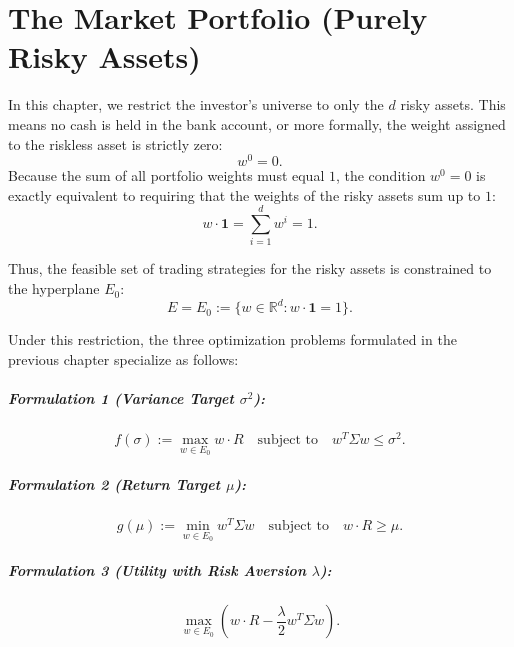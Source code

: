 \chapter{The Market Portfolio (Purely Risky Assets)}

In this chapter, we restrict the investor's universe to only the $d$ risky assets. This means no cash is held in the bank account, or more formally, the weight assigned to the riskless asset is strictly zero:
\begin{equation}
    w^0 = 0.
\end{equation}
Because the sum of all portfolio weights must equal $1$, the condition $w^0 = 0$ is exactly equivalent to requiring that the weights of the risky assets sum up to $1$:
\begin{equation}
    w \cdot \mathbf{1} = \sum_{i=1}^d w^i = 1.
\end{equation}

Thus, the feasible set of trading strategies for the risky assets is constrained to the hyperplane $E_0$:
\begin{equation}
    E = E_0 := \{ w \in \mathbb{R}^d : w \cdot \mathbf{1} = 1 \}.
\end{equation}

Under this restriction, the three optimization problems formulated in the previous chapter specialize as follows:

\paragraph{Formulation 1 (Variance Target $\sigma^2$):}
\begin{equation}
    f(\sigma) := \max_{w \in E_0} w \cdot R \quad \text{subject to} \quad w^T \Sigma w \leq \sigma^2. \label{eq:p1_market}
\end{equation}

\paragraph{Formulation 2 (Return Target $\mu$):}
\begin{equation}
    g(\mu) := \min_{w \in E_0} w^T \Sigma w \quad \text{subject to} \quad w \cdot R \geq \mu. \label{eq:p2_market}
\end{equation}

\paragraph{Formulation 3 (Utility with Risk Aversion $\lambda$):}
\begin{equation}
    \max_{w \in E_0} \left( w \cdot R - \frac{\lambda}{2} w^T \Sigma w \right). \label{eq:p3_market}
\end{equation}

